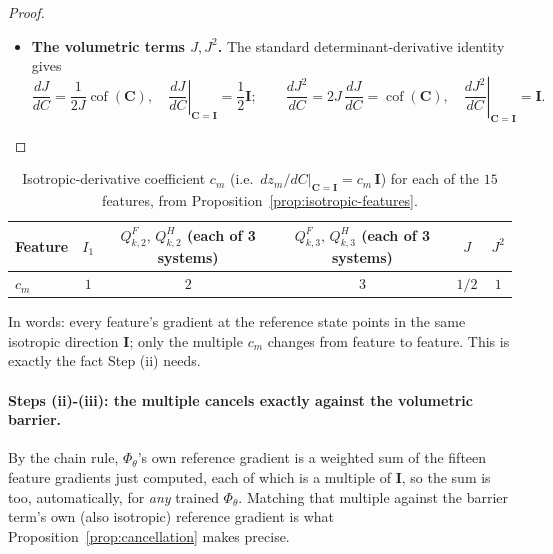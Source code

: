 \documentclass[10pt,a4paper]{article}
\newcommand{\Cof}{\operatorname{cof}}
\begin{document}
\begin{proof}
\begin{itemize}
\item \textbf{The volumetric terms $J,J^2$.} The standard
determinant-derivative identity gives
\begin{equation}
 \frac{dJ}{dC}=\frac1{2J}\Cof(\bm C),\quad
 \left.\frac{dJ}{dC}\right|_{\bm C=\bm I}=\frac12\bm I;
 \qquad
 \frac{dJ^2}{dC}=2J\,\frac{dJ}{dC}=\Cof(\bm C),\quad
 \left.\frac{dJ^2}{dC}\right|_{\bm C=\bm I}=\bm I.
\end{equation}
\end{itemize}
\end{proof}

\begin{table}[h]
\centering
\caption{Isotropic-derivative coefficient $c_m$ (i.e.\ $dz_m/dC|_{\bm C=\bm I}=c_m\,\bm I$)
for each of the $15$ features, from Proposition~\ref{prop:isotropic-features}.}
\label{tab:coefficients}
\begin{tabular}{lccccc}
\toprule
Feature & $I_1$ & $Q_{k,2}^F,\,Q_{k,2}^H$ (each of 3 systems) & $Q_{k,3}^F,\,Q_{k,3}^H$ (each of 3 systems) & $J$ & $J^2$\\
\midrule
$c_m$ & $1$ & $2$ & $3$ & $1/2$ & $1$\\
\bottomrule
\end{tabular}
\end{table}
In words: every feature's gradient at the reference state points in the
same isotropic direction $\bm I$; only the multiple $c_m$ changes from
feature to feature. This is exactly the fact Step (ii) needs.

\paragraph{Steps (ii)-(iii): the multiple cancels exactly against the volumetric barrier.}
By the chain rule, $\Phi_\theta$'s own reference gradient is a weighted
sum of the fifteen feature gradients just computed, each of which is a
multiple of $\bm I$, so the sum is too, automatically, for \emph{any}
trained $\Phi_\theta$. Matching that multiple against the barrier
term's own (also isotropic) reference gradient is what
Proposition~\ref{prop:cancellation} makes precise.
\end{document}
